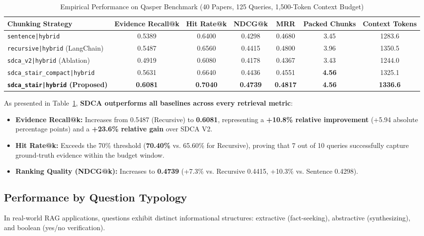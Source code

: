 \documentclass[conference]{IEEEtran}
\begin{document}
\begin{table}[t]
\centering
\caption{Empirical Performance on Qasper Benchmark (40 Papers, 125 Queries, 1,500-Token Context Budget)}
\label{tab:qasper_results}
\begin{tabular}{lcccccc}
\toprule
\textbf{Chunking Strategy} & \textbf{Evidence Recall@k} & \textbf{Hit Rate@k} & \textbf{NDCG@k} & \textbf{MRR} & \textbf{Packed Chunks} & \textbf{Context Tokens} \\
\midrule
\texttt{sentence|hybrid} & 0.5389 & 0.6400 & 0.4298 & 0.4680 & 3.45 & 1283.6 \\
\texttt{recursive|hybrid} (LangChain) & 0.5487 & 0.6560 & 0.4415 & 0.4800 & 3.96 & 1350.5 \\
\texttt{sdca\_v2|hybrid} (Ablation) & 0.4919 & 0.6080 & 0.4178 & 0.4367 & 3.43 & 1244.0 \\
\texttt{sdca\_stair\_compact|hybrid} & 0.5631 & 0.6640 & 0.4436 & 0.4551 & \textbf{4.56} & 1325.1 \\
\textbf{\texttt{sdca\_stair|hybrid} (Proposed)} & \textbf{0.6081} & \textbf{0.7040} & \textbf{0.4739} & \textbf{0.4817} & \textbf{4.56} & \textbf{1336.6} \\
\bottomrule
\end{tabular}
\end{table}

As presented in Table~\ref{tab:qasper_results}, \textbf{SDCA outperforms all baselines across every retrieval metric}:
\begin{itemize}
    \item \textbf{Evidence Recall@k:} Increases from 0.5487 (Recursive) to \textbf{0.6081}, representing a \textbf{+10.8\% relative improvement} (+5.94 absolute percentage points) and a \textbf{+23.6\% relative gain} over SDCA V2.
    \item \textbf{Hit Rate@k:} Exceeds the 70\% threshold (\textbf{70.40\%} vs. 65.60\% for Recursive), proving that 7 out of 10 queries successfully capture ground-truth evidence within the budget window.
    \item \textbf{Ranking Quality (NDCG@k):} Increases to \textbf{0.4739} (+7.3\% vs. Recursive 0.4415, +10.3\% vs. Sentence 0.4298).
\end{itemize}

\subsection{Performance by Question Typology}
In real-world RAG applications, questions exhibit distinct informational structures: extractive (fact-seeking), abstractive (synthesizing), and boolean (yes/no verification).
\end{document}
